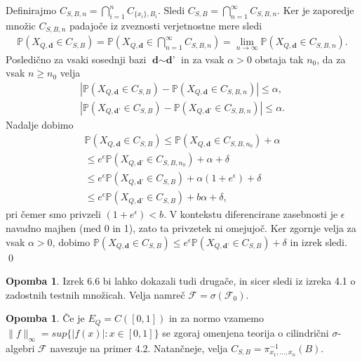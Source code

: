 \documentclass[12pt,a4paper]{amsart}
\theoremstyle{definition} %
\newtheorem{opomba}[definicija]{Opomba}
\theoremstyle{plain} %
\begin{document}
\proof Definirajmo $C_{S,B,n} = \bigcap_{i=1}^{n}C_{\{x_i\},B_i}$. Sledi $C_{S,B} = \bigcap_{n=1}^{\infty}C_{S,B,n}$. Ker je zaporedje množic $C_{S,B,n}$ padajoče iz zveznosti verjetnostne mere sledi
\begin{gather*}
\mathbb{P}(X_{Q,\textbf{d}} \in C_{S,B}) = \mathbb{P}(X_{Q,\textbf{d}} \in  \bigcap_{n=1}^{\infty}C_{S,B,n}) = \lim_{n \rightarrow \infty} \mathbb{P}(X_{Q,\textbf{d}} \in C_{S,B,n}).
\end{gather*}
Posledično za vsaki sosednji bazi $\textbf{d} \sim \textbf{d'}$ in za vsak $\alpha > 0$ obstaja tak $n_0$, da za vsak $n \geq n_0$ velja
\begin{gather*}
|\mathbb{P}(X_{Q,\textbf{d}} \in C_{S,B}) - \mathbb{P}(X_{Q,\textbf{d}} \in C_{S,B,n})| \leq  \alpha, \\ |\mathbb{P}(X_{Q,\textbf{d'}} \in C_{S,B}) - \mathbb{P}(X_{Q,\textbf{d'}} \in C_{S,B,n})| \leq \alpha.
\end{gather*}
Nadalje dobimo
\begin{gather*}
\mathbb{P}(X_{Q,\textbf{d}} \in C_{S,B})  \leq \mathbb{P}(X_{Q,\textbf{d}} \in C_{S,B, n_0}) + \alpha \\ \leq e^{\epsilon} \mathbb{P}(X_{Q,\textbf{d'}} \in C_{S,B,n_0})  + \alpha + \delta \\ \leq e^{\epsilon} \mathbb{P}(X_{Q,\textbf{d'}} \in C_{S,B})  + \alpha(1 + e^{\epsilon}) + \delta \\ \leq e^{\epsilon} \mathbb{P}(X_{Q,\textbf{d'}} \in C_{S,B})  + b \alpha + \delta,
\end{gather*}
pri čemer smo privzeli $(1+e^{\epsilon}) < b$. V kontekstu diferencirane zasebnosti je $\epsilon$ navadno majhen (med 0 in 1), zato ta privzetek ni omejujoč. Ker zgornje velja za vsak $\alpha > 0$, dobimo $\mathbb{P}(X_{Q,\textbf{d}} \in C_{S,B}) \leq e^{\epsilon} \mathbb{P}(X_{Q,\textbf{d'}} \in C_{S,B}) + \delta$ in izrek sledi.
\qed
\newline
\begin{opomba}
Izrek 6.6 bi lahko dokazali tudi drugače, in sicer sledi iz izreka 4.1 o zadostnih testnih množicah. Velja namreč $\mathcal{F} = \sigma(\mathcal{F}_0).$
\end{opomba}
\begin{opomba}
Če je $E_Q = C ([0,1])$ in za normo vzamemo $\|f\|_{\infty} = sup\{|f(x)| : x \in [0,1]\}$ se zgoraj omenjena teorija o cilindrični $\sigma$-algebri $\mathcal{F}$ navezuje na primer 4.2. Natančneje, velja $C_{S,B} = \pi_{x_1,...,x_n}^{-1} (B).$
\end{opomba}
\end{document}
